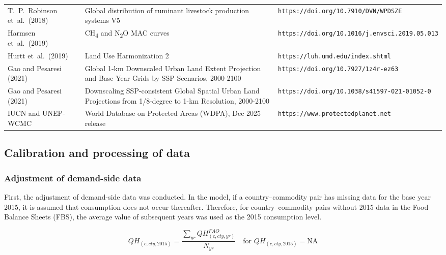 \begin{xltabular}{\linewidth}{l X X}
  T.~P.~Robinson et~al.~(2018)~\cite{robinsonGlobalDistributionRuminant2018} & Global distribution of ruminant livestock production systems V5 & \nolinkurl{https://doi.org/10.7910/DVN/WPDSZE} \\
  Harmsen et~al.~(2019)~\cite{harmsenLongtermMarginalAbatement2019a}    & CH\textsubscript{4} and N\textsubscript{2}O MAC curves & \nolinkurl{https://doi.org/10.1016/j.envsci.2019.05.013} \\
  Hurtt et~al.~(2019)~\cite{hurttHarmonizationGlobalLand2020}      & Land Use Harmonization 2 & \nolinkurl{https://luh.umd.edu/index.shtml} \\
  Gao and Pesaresi (2021)~\cite{gaoGlobal1kmDownscaled2021} & Global 1-km Downscaled Urban Land Extent Projection and Base Year Grids by SSP Scenarios, 2000-2100 & \nolinkurl{https://doi.org/10.7927/1z4r-ez63} \\
  Gao and Pesaresi (2021)~\cite{gaoDownscalingSSPconsistent2021} & Downscaling SSP-consistent Global Spatial Urban Land Projections from 1/8-degree to 1-km Resolution, 2000-2100 & \nolinkurl{https://doi.org/10.1038/s41597-021-01052-0} \\
  IUCN and UNEP-WCMC~\cite{iucnUNEPWCMCWorldDatabase2025} & World Database on Protected Areas (WDPA), Dec 2025 release & \nolinkurl{https://www.protectedplanet.net} \\
\end{xltabular}

\subsection{Calibration and processing of data}
\subsubsection{Adjustment of demand-side data}

First, the adjustment of demand-side data was conducted. 
In the model, if a country–commodity pair has missing data for the base year 2015, it is assumed that consumption does not occur thereafter. 
Therefore, for country–commodity pairs without 2015 data in the Food Balance Sheets (FBS), the average value of subsequent years was used as the 2015 consumption level.

\begin{equation}
QH_{(c,cty,2015)} = \frac{\sum_{yr} QH^{FAO}_{(c,cty,yr)}}{N_{yr}} 
\quad \text{for } QH_{(c,cty,2015)} = \text{NA}
\end{equation}

